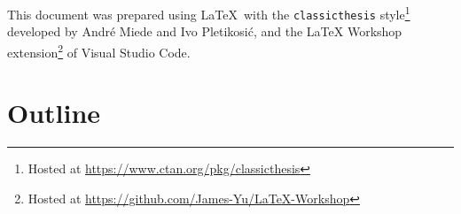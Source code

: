 \documentclass[../thesis.tex]{subfiles}
\begin{document}
This document was prepared using \LaTeX\ with the \texttt{classicthesis}
style\footnote{Hosted at \url{https://www.ctan.org/pkg/classicthesis}} developed by
Andr\'e Miede and Ivo Pletikosić, and the LaTeX Workshop extension\footnote{Hosted at
\url{https://github.com/James-Yu/LaTeX-Workshop}} of Visual Studio Code.


\section{Outline}
\end{document}
